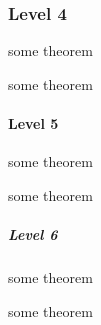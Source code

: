 \hypertarget{level-4}{%
\subsubsection{Level 4}\label{level-4}}

\begin{Theorem}
some theorem
\end{Theorem}

\begin{Theorem}
some theorem
\end{Theorem}

\hypertarget{level-5}{%
\paragraph{Level 5}\label{level-5}}

\begin{Theorem}
some theorem
\end{Theorem}

\begin{Theorem}
some theorem
\end{Theorem}

\hypertarget{level-6}{%
\subparagraph{Level 6}\label{level-6}}

\begin{Theorem}
some theorem
\end{Theorem}

\begin{Theorem}
some theorem
\end{Theorem}
